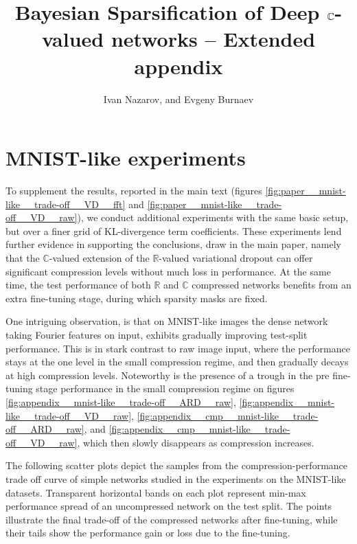\documentclass[a4paper]{extarticle}
\title{Bayesian Sparsification of Deep $\cplx$-valued networks -- Extended appendix}
\author{Ivan Nazarov, and Evgeny Burnaev}
\newcommand{\real}{\mathbb{R}}
\newcommand{\cplx}{\mathbb{C}}
\begin{document}
\maketitle
\tableofcontents
\listoffigures
\clearpage

\section{MNIST-like experiments} %
\label{sec:mnist_like_experiments}

To supplement the results, reported in the main text (figures \ref{fig:paper__mnist-like__trade-off__VD__fft}
and \ref{fig:paper__mnist-like__trade-off__VD__raw}), we conduct additional experiments
with the same basic setup, but over a finer grid of KL-divergence term coefficients.
%
These experiments lend further evidence in supporting the conclusions, draw in the main
paper, namely that the $\cplx$-valued extension of the $\real$-valued variational dropout
can offer significant compression levels without much loss in performance. At the same
time, the test performance of both $\real$ and $\cplx$ compressed networks benefits from
an extra fine-tuning stage, during which sparsity masks are fixed.

One intriguing observation, is that on MNIST-like images the dense network taking Fourier
features on input, exhibits gradually improving test-split performance. This is in stark
contrast to raw image input, where the performance stays at the one level in the small
compression regime, and then gradually decays at high compression levels. Noteworthy is
the presence of a trough in the pre fine-tuning stage performance in the small compression
regime on figures
\ref{fig:appendix__mnist-like__trade-off__ARD__raw},
\ref{fig:appendix__mnist-like__trade-off__VD__raw},
\ref{fig:appendix__cmp__mnist-like__trade-off__ARD__raw},
and \ref{fig:appendix__cmp__mnist-like__trade-off__VD__raw}, which then slowly disappears
as compression increases.

The following scatter plots depict the samples from the compression-performance trade off
curve of simple networks studied in the experiments on the MNIST-like datasets. Transparent
horizontal bands on each plot represent min-max performance spread of an uncompressed
network on the test split. The points illustrate the final trade-off of the compressed
networks after fine-tuning, while their tails show the performance gain or loss due to
the fine-tuning.
\end{document}
